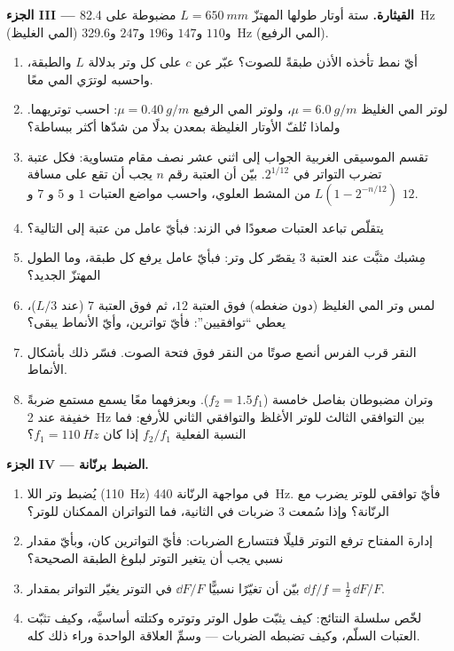 \begin{problem}
\medskip
\noindent\textbf{الجزء III --- القيثارة.}
ستة أوتار طولها المهتزّ $L = \qty{650}{mm}$ مضبوطة على
\qty{82.4}{Hz} (المي الغليظ) و$110$ و$147$ و$196$ و$247$ و\qty{329.6}{Hz}
(المي الرفيع).
\begin{enumerate}[resume]
  \item أيّ نمط تأخذه الأذن طبقةً للصوت؟ عبّر عن $c$ على كل
        وتر بدلالة $L$ والطبقة، واحسبه لوترَي المي معًا.
  \item لوتر المي الغليظ $\mu = \qty{6.0}{g/m}$، ولوتر المي الرفيع
        $\mu = \qty{0.40}{g/m}$: احسب توتريهما. ولماذا تُلفّ الأوتار
        الغليظة بمعدن بدلًا من شدّها أكثر ببساطة؟
  \item تقسم الموسيقى الغربية الجواب إلى اثني عشر نصف مقام متساوية:
        فكل عتبة تضرب التواتر في $2^{1/12}$. بيّن أن
        العتبة رقم $n$ يجب أن تقع على مسافة $L(1 - 2^{-n/12})$ من
        المشط العلوي، واحسب مواضع العتبات $1$ و $5$ و $7$ و $12$.
  \item يتقلّص تباعد العتبات صعودًا في الزند: فبأيّ عامل من
        عتبة إلى التالية؟
  \item مِشبك مثبَّت عند العتبة $3$ يقصّر كل وتر: فبأيّ
        عامل يرفع كل طبقة، وما الطول المهتزّ
        الجديد؟
  \item لمس وتر المي الغليظ (دون ضغطه) فوق العتبة $12$، ثم
        فوق العتبة $7$ (عند $L/3$)، يعطي ``توافقيين'': فأيّ
        تواترين، وأيّ الأنماط يبقى؟
  \item النقر قرب الفرس أنصع صوتًا من النقر فوق
        فتحة الصوت. فسّر ذلك بأشكال الأنماط.
  \item وتران مضبوطان بفاصل خامسة ($f_2 = 1.5f_1$). وبعزفهما
        معًا يسمع مستمع ضربةً خفيفة عند \qty{2}{Hz}
        بين التوافقي الثالث للوتر الأغلظ والتوافقي الثاني
        للأرفع: فما النسبة الفعلية $f_2/f_1$ إذا كان
        $f_1 = \qty{110}{Hz}$؟
\end{enumerate}

\medskip
\noindent\textbf{الجزء IV --- الضبط برنّانة.}
\begin{enumerate}[resume]
  \item يُضبط وتر اللا (\qty{110}{Hz}) في مواجهة الرنّانة \qty{440}{Hz}.
        فأيّ توافقي للوتر يضرب مع الرنّانة؟ وإذا
        سُمعت \qty{3}{} ضربات في الثانية، فما التواتران الممكنان
        للوتر؟
  \item إدارة المفتاح ترفع التوتر قليلًا فتتسارع الضربات:
        فأيّ التواترين كان، وبأيّ مقدار نسبي
        يجب أن يتغير التوتر لبلوغ الطبقة الصحيحة؟
  \item بيّن أن تغيّرًا نسبيًّا $\dd F/F$ في التوتر يغيّر
        التواتر بمقدار $\dd f/f = \tfrac12\,\dd F/F$.
  \item لخّص سلسلة النتائج: كيف يثبّت طول الوتر وتوتره
        وكتلته أساسيَّه، وكيف تثبّت العتبات السلّم، وكيف
        تضبطه الضربات --- وسمِّ العلاقة الواحدة وراء ذلك كله.
\end{enumerate}
\end{problem}
